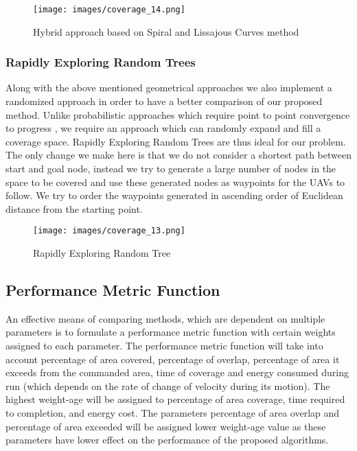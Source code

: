 \begin{figure}[htbp] %
 \centering
   \texttt{[image: images/coverage\_14.png]}
   \caption[Lissajous Curve \cite{14}]
   {Hybrid approach based on Spiral and Lissajous Curves method  \cite{14}}
   
\label{fig:hsjc3333}
\end{figure}

\pagebreak
\subsubsection{Rapidly Exploring Random Trees}
Along with the above mentioned geometrical approaches we also implement a randomized approach in order to have a better comparison of our proposed method. Unlike probabilistic approaches which require point to point convergence to progress \cite{15}, we require an approach which can randomly expand and fill a coverage space. Rapidly Exploring Random Trees are thus ideal for our problem\cite{15}. The only change we make here is that we do not consider a shortest path between start and goal node, instead we try to generate a large number of nodes in the space to be covered and use these generated nodes as waypoints for the UAVs to follow. We try to order the waypoints generated in ascending order of Euclidean distance from the starting point.

\begin{figure}[htbp] %
 \centering
   \texttt{[image: images/coverage\_13.png]}
   \caption[Rapidly Exploring Random Tree \cite{15}]
   {Rapidly Exploring Random Tree \cite{15}}
   
\label{fig:rrt}
\end{figure}

\subsection{Performance Metric Function}

An effective means of comparing methods, which are dependent on multiple parameters is to formulate a performance metric function with certain weights assigned to each parameter. The performance metric function will take into account percentage of area covered, percentage of overlap, percentage of area it exceeds from the commanded area, time of coverage and energy consumed during run (which depends on the rate of change of velocity during its motion). The highest weight-age will be assigned to percentage of area coverage, time required to completion, and energy cost. The parameters percentage of area overlap and percentage of area exceeded will be assigned lower weight-age value as these parameters have lower effect on the performance of the proposed algorithms.

